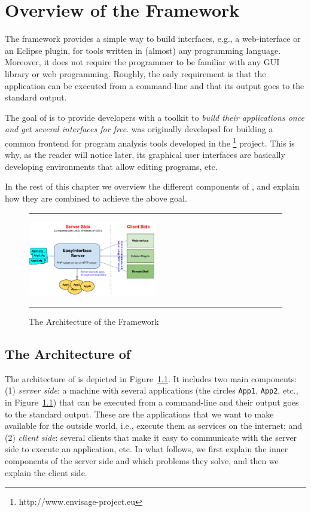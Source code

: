 {%
}


\chapter{Overview of the \ei Framework}
\label{ch:overview}

The \ei framework provides a simple way to build interfaces, e.g., a
web-interface or an Eclipse plugin, for tools written in (almost) any
programming language.
%
Moreover, it does not require the programmer to be familiar with any
GUI library or web programming. Roughly, the only requirement is that
the application can be executed from a command-line and that its
output goes to the standard output.
%

The goal of \ei is to provide developers with a toolkit to \emph{build
  their applications once and get several interfaces for free}.
%
\ei was originally developed for building a common frontend for
program analysis tools developed in the
\envisage\footnote{http://www.envisage-project.eu} project. This is
why, as the reader will notice later, its graphical user interfaces
are basically developing environments that allow editing programs,
etc.

In the rest of this chapter we overview the different components of
\ei, and explain how they are combined to achieve the above goal.

\begin{figure}[h]
\hrule\smallskip
\begin{center}
\includegraphics[width=0.5\textwidth]{fig/ei.pdf}
\end{center}
\caption{The Architecture of the \ei Framework}
\label{fig:eiframework}
\hrule
\end{figure}

\section{The Architecture of \ei}
\label{ch:overview:arch}

The architecture of \ei is depicted in
Figure~\ref{fig:eiframework}. It includes two main components:
%
(1) \emph{server side}: a machine with several applications (the
circles \texttt{App1}, \texttt{App2}, etc., in
Figure~\ref{fig:eiframework}) that can be executed from a command-line
and their output goes to the standard output. These are the
applications that we want to make available for the outside world,
i.e., execute them as services on the internet; and
%
(2) \emph{client side}: several clients that make it easy to
communicate with the server side to execute an application, etc.
%
In what follows, we first explain the inner components of the server
side and which problems they solve, and then we explain the client
side.
%

